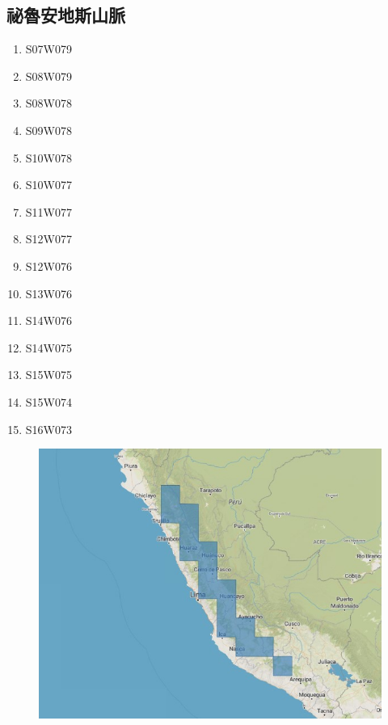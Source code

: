 \documentclass[a4paper, 12pt]{article}
\begin{document}
\begin{appendices}
    \subsection{祕魯安地斯山脈}
    \begin{multicols}{4}
        \begin{enumerate}
            \item S07W079
            \item S08W079
            \item S08W078
            \item S09W078
            \item S10W078
            \item S10W077
            \item S11W077
            \item S12W077
            \item S12W076
            \item S13W076
            \item S14W076
            \item S14W075
            \item S15W075
            \item S15W074
            \item S16W073
        \end{enumerate}
    \end{multicols}
    \begin{figure}[H]
        \centering
        \includegraphics[width=0.8\linewidth]{fig/a3.jpg}
    \end{figure}

\end{appendices}
\end{document}
